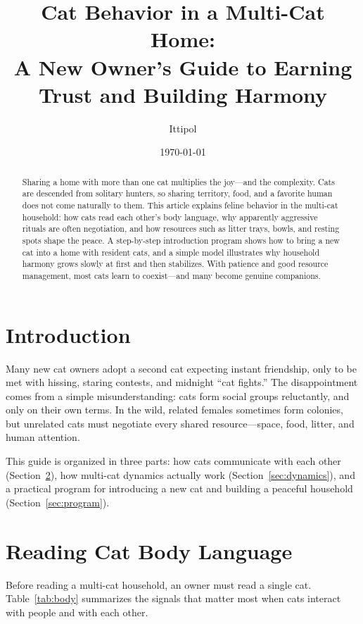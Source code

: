 \documentclass[12pt,a4paper]{article}
\title{Cat Behavior in a Multi-Cat Home:\\A New Owner's Guide to Earning Trust and Building Harmony}
\author{Ittipol}
\date{\today}
\begin{document}
\maketitle

\begin{abstract}
Sharing a home with more than one cat multiplies the joy---and the complexity. Cats are
descended from solitary hunters, so sharing territory, food, and a favorite human does
not come naturally to them. This article explains feline behavior in the multi-cat
household: how cats read each other's body language, why apparently aggressive rituals
are often negotiation, and how resources such as litter trays, bowls, and resting spots
shape the peace. A step-by-step introduction program shows how to bring a new cat into
a home with resident cats, and a simple model illustrates why household harmony grows
slowly at first and then stabilizes. With patience and good resource management, most
cats learn to coexist---and many become genuine companions.
\end{abstract}

\tableofcontents
\newpage

\section{Introduction}
Many new cat owners adopt a second cat expecting instant friendship, only to be met
with hissing, staring contests, and midnight ``cat fights.'' The disappointment comes
from a simple misunderstanding: cats form social groups reluctantly, and only on their
own terms. In the wild, related females sometimes form colonies, but unrelated cats
must negotiate every shared resource---space, food, litter, and human attention.

This guide is organized in three parts: how cats communicate with each other
(Section~\ref{sec:body}), how multi-cat dynamics actually work
(Section~\ref{sec:dynamics}), and a practical program for introducing a new cat and
building a peaceful household (Section~\ref{sec:program}).

\section{Reading Cat Body Language}
\label{sec:body}
Before reading a multi-cat household, an owner must read a single cat. Table~\ref{tab:body}
summarizes the signals that matter most when cats interact with people and with each other.
\end{document}
